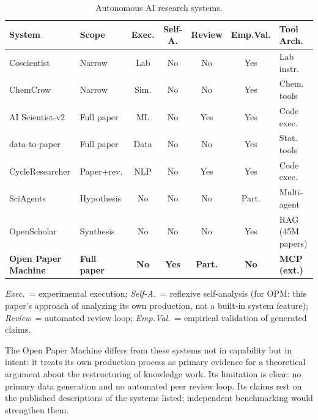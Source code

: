 \documentclass{article}
\begin{document}
\begin{table}[ht]
\centering
\small
\caption{Autonomous AI research systems.}
\label{tab:systems}
\begin{tabularx}{\textwidth}{@{} >{\raggedright\arraybackslash}X l c c c c >{\raggedright\arraybackslash}p{2.2cm} @{}}
\toprule
\textbf{System} & \textbf{Scope} & \textbf{Exec.} & \textbf{Self-A.} & \textbf{Review} & \textbf{Emp.Val.} & \textbf{Tool Arch.} \\
\midrule
Coscientist \citep{boiko2023autonomous} & Narrow & Lab & No & No & Yes & Lab instr. \\
ChemCrow \citep{bran2024chemistry} & Narrow & Sim. & No & No & Yes & Chem. tools \\
AI Scientist-v2 \citep{yamada2025scientist} & Full paper & ML & No & Yes & Yes & Code exec. \\
data-to-paper \citep{ifargan2024autonomous} & Full paper & Data & No & No & Yes & Stat. tools \\
CycleResearcher \citep{weng2024cycleresearcher} & Paper+rev. & NLP & No & Yes & Yes & Code exec. \\
SciAgents \citep{ghafarollahi2024sciagents} & Hypothesis & No & No & No & Part. & Multi-agent \\
OpenScholar \citep{asai2024openscholar} & Synthesis & No & No & No & Yes & RAG (45M papers) \\
\textbf{Open Paper Machine} & \textbf{Full paper} & \textbf{No} & \textbf{Yes} & \textbf{Part.} & \textbf{No} & \textbf{MCP (ext.)} \\
\bottomrule
\end{tabularx}

\vspace{0.5em}
\footnotesize\noindent\textit{Exec.}~= experimental execution; \textit{Self-A.}~= reflexive self-analysis (for OPM: this paper's approach of analyzing its own production, not a built-in system feature); \textit{Review}~= automated review loop; \textit{Emp.Val.}~= empirical validation of generated claims.
\end{table}

The Open Paper Machine differs from these systems not in capability but in intent: it treats its own production process as primary evidence for a theoretical argument about the restructuring of knowledge work. Its limitation is clear: no primary data generation and no automated peer review loop. Its claims rest on the published descriptions of the systems listed; independent benchmarking would strengthen them.
\end{document}
